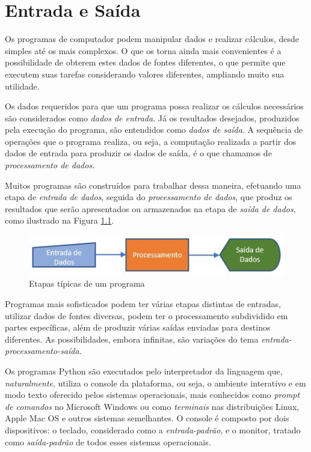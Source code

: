 \documentclass[
]{book}
\begin{document}
\hypertarget{e-s}{%
\chapter{Entrada e Saída}\label{e-s}}

Os programas de computador podem manipular dados e realizar cálculos, desde simples até os mais complexos. O que os torna ainda mais convenientes é a possibilidade de obterem estes dados de fontes diferentes, o que permite que executem suas tarefas considerando valores diferentes, ampliando muito sua utilidade.

Os dados requeridos para que um programa possa realizar os cálculos necessários são considerados como \emph{dados de entrada}. Já os resultados desejados, produzidos pela execução do programa, são entendidos como \emph{dados de saída}. A sequência de operações que o programa realiza, ou seja, a computação realizada a partir dos dados de entrada para produzir os dados de saída, é o que chamamos de \emph{processamento de dados}.

Muitos programas são construídos para trabalhar dessa maneira, efetuando uma etapa de \emph{entrada de dados}, seguida do \emph{processamento de dados}, que produz os resultados que serão apresentados ou armazenados na etapa de \emph{saída de dados}, como ilustrado na Figura \ref{fig:03-01}.

\begin{figure}
\centering
\includegraphics{images/03-01.jpg}
\caption{\label{fig:03-01}Etapas típicas de um programa}
\end{figure}

Programas mais sofisticados podem ter várias etapas distintas de entradas, utilizar dados de fontes diversas, podem ter o processamento subdividido em partes específicas, além de produzir várias saídas enviadas para destinos diferentes. As possibilidades, embora infinitas, são variações do tema \emph{entrada-processamento-saída}.

Os programas Python são executados pelo interpretador da linguagem que, \emph{naturalmente}, utiliza o console da plataforma, ou seja, o ambiente interativo e em modo texto oferecido pelos sistemas operacionais, mais conhecidos como \emph{prompt de comandos} no Microsoft Windows ou como \emph{terminais} nas distribuições Linux, Apple Mac OS e outros sistemas semelhantes. O console é composto por dois dispositivos: o teclado, considerado como a \emph{entrada-padrão}, e o monitor, tratado como \emph{saída-padrão} de todos esses sistemas operacionais.
\end{document}

